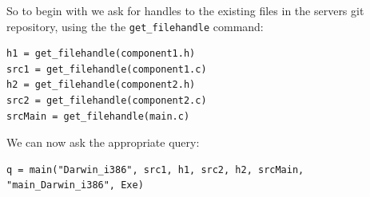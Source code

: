 \documentclass{article}
\begin{document}
So to begin with we ask for handles to the existing files in the servers git repository,
using the the {\tt get\_filehandle} command:
\begin{verbatim}
h1 = get_filehandle(component1.h)
src1 = get_filehandle(component1.c)
h2 = get_filehandle(component2.h)
src2 = get_filehandle(component2.c)
srcMain = get_filehandle(main.c)
\end{verbatim}
We can now ask the appropriate query:
\begin{verbatim}
q = main("Darwin_i386", src1, h1, src2, h2, srcMain, "main_Darwin_i386", Exe)
\end{verbatim}
\end{document}
